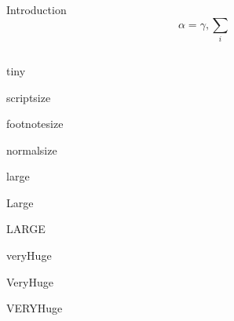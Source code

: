\documentclass[final,hyperref={pdfpagelabels=false}]{beamer}
\begin{document}
\begin{frame}{}
\begin{columns}[T]
\begin{column}{.43\paperwidth}
\begin{block}{Introduction}
	{\veryHuge $$\alpha=\gamma, \sum_{i}$$}\par 

\end{block}
    
\end{column}
\end{columns}

\begin{columns}[T]
\begin{column}{.86\paperwidth}

\begin{block}{}
\centering
	{\tiny tiny}\par
	{\scriptsize scriptsize}\par
	{\footnotesize footnotesize}\par
	{\normalsize normalsize}\par
	{\large large}\par
	{\Large Large}\par
	{\LARGE LARGE}\par
	{\veryHuge veryHuge}\par
	{\VeryHuge VeryHuge}\par
	{\VERYHuge VERYHuge}\par
\end{block}

\end{column}
\end{columns}


\end{frame}
\end{document}
